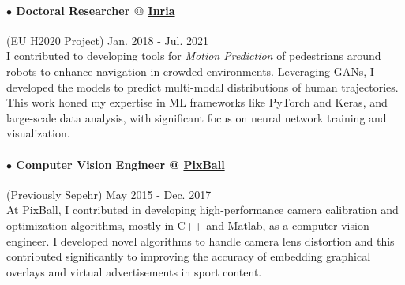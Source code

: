 \documentclass[10pt]{res}
\begin{document}
\begin{resume}
\paragraph{$\bullet$ Doctoral Researcher @ \href{http://inria.fr} {Inria}} (EU H2020 Project) \hfill Jan. 2018 - Jul. 2021\\
I contributed to developing tools for \textit{Motion Prediction} of pedestrians around robots to enhance navigation in crowded environments. Leveraging GANs, I developed the models to predict multi-modal distributions of human trajectories. This work honed my expertise in ML frameworks like PyTorch and Keras, and large-scale data analysis, with significant focus on neural network training and visualization.
\vspace{-8pt}

\paragraph{$\bullet$ Computer Vision Engineer @ \href{http://pixballsports.com}{PixBall}} (Previously Sepehr) \hfill May 2015 - Dec. 2017\\
At PixBall, I contributed in developing high-performance camera calibration and optimization algorithms, mostly in C++ and Matlab, as a computer vision engineer. 
I developed novel algorithms to handle camera lens distortion and this contributed significantly to improving the accuracy of embedding graphical overlays and virtual advertisements in sport content.
\vspace{-12pt}





\end{resume}
\end{document}
